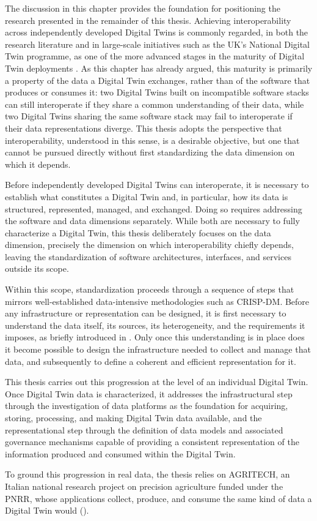\begin{partsummary}

The discussion in this chapter provides the foundation for positioning the research presented in the remainder of this thesis. Achieving interoperability across independently developed Digital Twins is commonly regarded, in both the research literature and in large-scale initiatives such as the UK's National Digital Twin programme, as one of the more advanced stages in the maturity of Digital Twin deployments \cite{klar2024maturity,dtarch}. As this chapter has already argued, this maturity is primarily a property of the data a Digital Twin exchanges, rather than of the software that produces or consumes it: two Digital Twins built on incompatible software stacks can still interoperate if they share a common understanding of their data, while two Digital Twins sharing the same software stack may fail to interoperate if their data representations diverge. This thesis adopts the perspective that interoperability, understood in this sense, is a desirable objective, but one that cannot be pursued directly without first standardizing the data dimension on which it depends.

Before independently developed Digital Twins can interoperate, it is necessary to establish what constitutes a Digital Twin and, in particular, how its data is structured, represented, managed, and exchanged. Doing so requires addressing the software and data dimensions separately. While both are necessary to fully characterize a Digital Twin, this thesis deliberately focuses on the data dimension, precisely the dimension on which interoperability chiefly depends, leaving the standardization of software architectures, interfaces, and services outside its scope.

Within this scope, standardization proceeds through a sequence of steps that mirrors well-established data-intensive methodologies such as CRISP-DM. Before any infrastructure or representation can be designed, it is first necessary to understand the data itself, its sources, its heterogeneity, and the requirements it imposes, as briefly introduced in . Only once this understanding is in place does it become possible to design the infrastructure needed to collect and manage that data, and subsequently to define a coherent and efficient representation for it.

This thesis carries out this progression at the level of an individual Digital Twin. Once Digital Twin data is characterized, it addresses the infrastructural step through the investigation of data platforms as the foundation for acquiring, storing, processing, and making Digital Twin data available, and the representational step through the definition of data models and associated governance mechanisms capable of providing a consistent representation of the information produced and consumed within the Digital Twin.

To ground this progression in real data, the thesis relies on AGRITECH, an Italian national research project on precision agriculture funded under the PNRR, whose applications collect, produce, and consume the same kind of data a Digital Twin would ().

\end{partsummary}